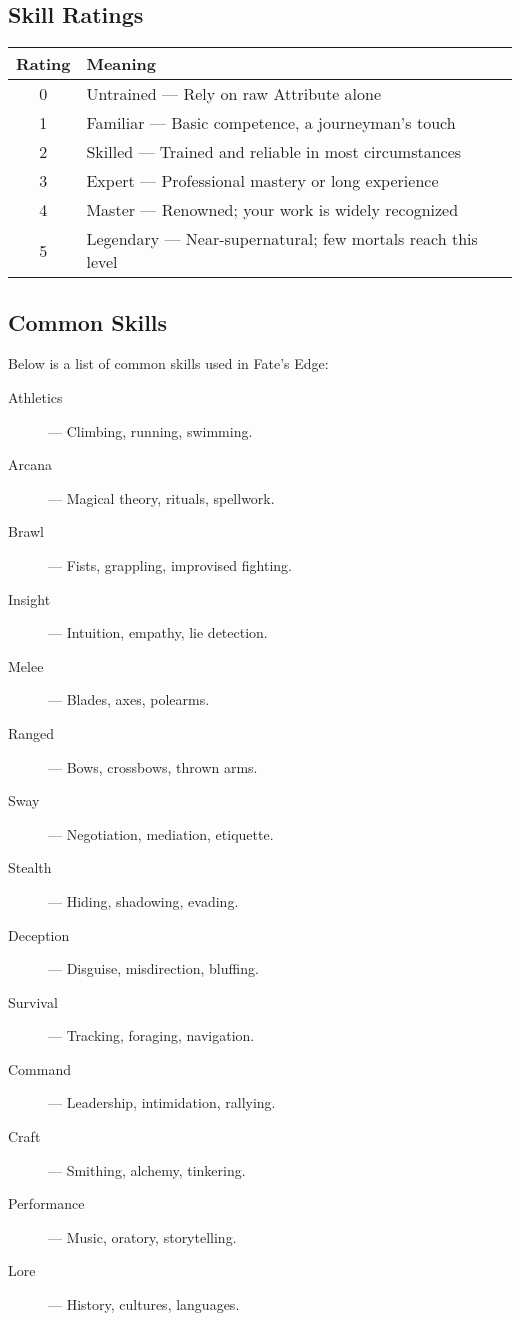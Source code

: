 \subsection*{Skill Ratings}

\begin{center}
\begin{tabular}{cl}
\toprule
\textbf{Rating} & \textbf{Meaning} \\
\midrule
0 & Untrained — Rely on raw Attribute alone \\
1 & Familiar — Basic competence, a journeyman's touch \\
2 & Skilled — Trained and reliable in most circumstances \\
3 & Expert — Professional mastery or long experience \\
4 & Master — Renowned; your work is widely recognized \\
5 & Legendary — Near-supernatural; few mortals reach this level \\
\bottomrule
\end{tabular}
\end{center}

\subsection*{Common Skills}

Below is a list of common skills used in Fate's Edge:

\begin{description}
  \item[Athletics]  — Climbing, running, swimming.
  \item[Arcana]  — Magical theory, rituals, spellwork.
  \item[Brawl]  — Fists, grappling, improvised fighting.
  \item[Insight]  — Intuition, empathy, lie detection.
  \item[Melee]  — Blades, axes, polearms.
  \item[Ranged]  — Bows, crossbows, thrown arms.
  \item[Sway]  — Negotiation, mediation, etiquette.
  \item[Stealth]  — Hiding, shadowing, evading.
  \item[Deception]  — Disguise, misdirection, bluffing.
  \item[Survival]  — Tracking, foraging, navigation.
  \item[Command]  — Leadership, intimidation, rallying.
  \item[Craft]  — Smithing, alchemy, tinkering.
  \item[Performance]  — Music, oratory, storytelling.
  \item[Lore]  — History, cultures, languages.
\end{description}

